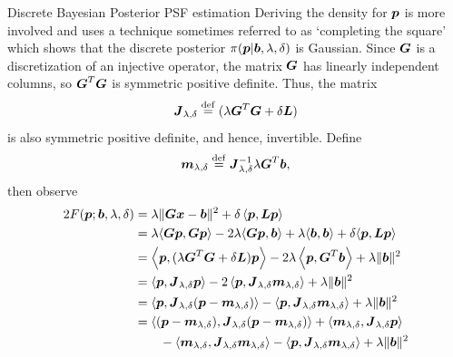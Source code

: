 \begin{chapter}{Discrete Bayesian Posterior PSF estimation}
Deriving the density for $\mbox{\boldmath$p$}$ is more involved and uses a technique sometimes referred to as `completing the square' \citep{stuart2010} which shows that the discrete posterior $\pi(\mbox{\boldmath$p$}|\mbox{\boldmath$b$},\lambda,\delta)$ is Gaussian.
Since $\mbox{\boldmath$G$}$ is a discretization of an injective operator, the matrix $\mbox{\boldmath$G$}$ has linearly independent columns, so $\mbox{\boldmath$G$}^T \mbox{\boldmath$G$}$ is symmetric positive definite.
Thus, the matrix 
\begin{equation} \label{eq:regularizationOperator}
  \mbox{\boldmath$J$}_{\lambda,\delta} \stackrel{\rm def}{=} (\lambda \mbox{\boldmath$G$}^T\mbox{\boldmath$G$} + \delta \mbox{\boldmath$L$})
\end{equation}
is also symmetric positive definite, and hence, invertible.
Define
\begin{equation} \label{eq:computeMAP}
  \mbox{\boldmath$m$}_{\lambda,\delta} \stackrel{\rm def}{=} \mbox{\boldmath$J$}_{\lambda,\delta}^{-1}\lambda \mbox{\boldmath$G$}^T\mbox{\boldmath$b$},
\end{equation} 
then observe
\begin{align}
  2F(\vect p; \vect b,\lambda,\delta) 
  &= \lambda\|\vect{Gx} - \vect b\|^2 + \delta\left\langle \vect p, \vect L \vect p\right\rangle \nonumber \\
  &= \lambda\langle \vect G\vect p,\vect G \vect p\rangle -2\lambda\langle \vect G\vect p,\vect b\rangle + \lambda\langle \vect b,\vect b\rangle + \delta \langle\vect p,\vect L\vect p\rangle \nonumber\\
  &= \left\langle \vect p,( \lambda \vect G^T \vect G + \delta \vect L)\vect p\right\rangle - 2 \lambda \left\langle \vect p, \vect G^T \vect b\right\rangle + \lambda \|\vect b\|^2\nonumber \\
  &= \left\langle \vect p,\vect J_{\lambda,\delta}\vect p\right\rangle - 2 \left\langle \vect p, \vect J_{\lambda,\delta}\vect m_{\lambda,\delta}\right\rangle + \lambda \|\vect b\|^2\nonumber \\
  &= \left\langle \vect p,\vect J_{\lambda,\delta}(\vect p - \vect m_{\lambda,\delta})\right\rangle - \left\langle \vect p, \vect J_{\lambda,\delta}\vect m_{\lambda,\delta}\right\rangle + \lambda \|\vect b\|^2\nonumber \\
  &= \left\langle (\vect p-\vect m_{\lambda,\delta}),\vect J_{\lambda,\delta}(\vect p - \vect m_{\lambda,\delta})\right \rangle  + \langle \vect m_{\lambda,\delta},\vect J_{\lambda,\delta}\vect p\rangle \nonumber\\
  &\quad\quad- \langle \vect m_{\lambda,\delta},\vect J_{\lambda,\delta}\vect m_{\lambda,\delta}\rangle - \left\langle \vect p, \vect J_{\lambda,\delta}\vect m_{\lambda,\delta}\right\rangle + \lambda \|\vect b\|^2\nonumber \\

\end{align}
\end{chapter}
